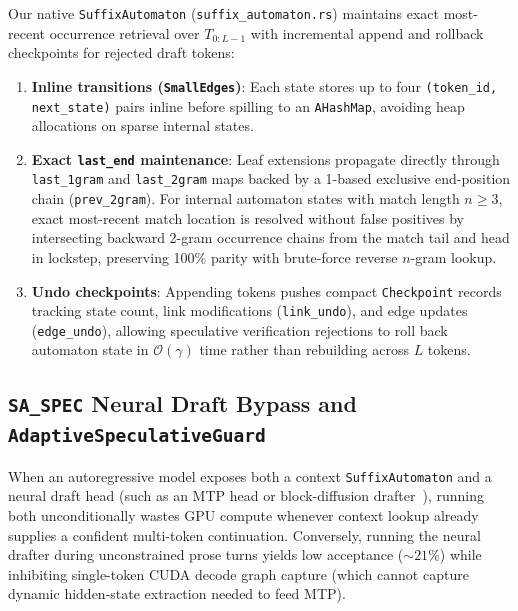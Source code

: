 \documentclass[11pt,a4paper]{article}
\begin{document}
Our native \texttt{SuffixAutomaton} (\texttt{suffix\_automaton.rs}) maintains exact most-recent occurrence retrieval over $T_{0:L-1}$ with incremental append and rollback checkpoints for rejected draft tokens:
\begin{enumerate}[noitemsep]
  \item \textbf{Inline transitions (\texttt{SmallEdges})}: Each state stores up to four \texttt{(token\_id, next\_state)} pairs inline before spilling to an \texttt{AHashMap}, avoiding heap allocations on sparse internal states.
  \item \textbf{Exact \texttt{last\_end} maintenance}: Leaf extensions propagate directly through \texttt{last\_1gram} and \texttt{last\_2gram} maps backed by a 1-based exclusive end-position chain (\texttt{prev\_2gram}). For internal automaton states with match length $n \ge 3$, exact most-recent match location is resolved without false positives by intersecting backward 2-gram occurrence chains from the match tail and head in lockstep, preserving 100\% parity with brute-force reverse $n$-gram lookup.
  \item \textbf{Undo checkpoints}: Appending tokens pushes compact \texttt{Checkpoint} records tracking state count, link modifications (\texttt{link\_undo}), and edge updates (\texttt{edge\_undo}), allowing speculative verification rejections to roll back automaton state in $\mathcal{O}(\gamma)$ time rather than rebuilding across $L$ tokens.
\end{enumerate}

\subsection{\texttt{SA\_SPEC} Neural Draft Bypass and \texttt{AdaptiveSpeculativeGuard}}
When an autoregressive model exposes both a context \texttt{SuffixAutomaton} and a neural draft head (such as an MTP head or block-diffusion drafter~\cite{cai2024medusa,fu2024lookahead}), running both unconditionally wastes GPU compute whenever context lookup already supplies a confident multi-token continuation. Conversely, running the neural drafter during unconstrained prose turns yields low acceptance ($\sim 21\%$) while inhibiting single-token CUDA decode graph capture (which cannot capture dynamic hidden-state extraction needed to feed MTP).
\end{document}
